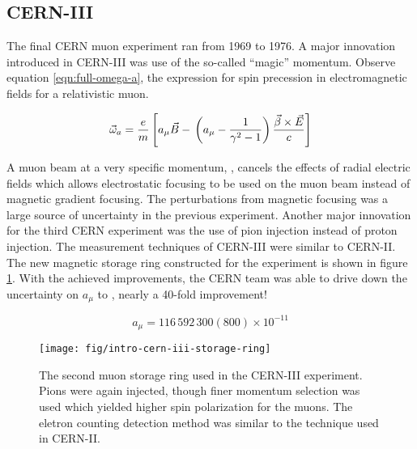 \subsection{CERN-III}
The final CERN muon \gmtwo experiment ran from 1969 to 1976.  A major innovation introduced in CERN-III was use of the so-called ``magic'' momentum. Observe equation \ref{eqn:full-omega-a}, the expression for spin precession in electromagnetic fields for a relativistic muon.

\begin{equation}
\label{eqn:full-omega-a}
\vec{\omega}_a = \frac{e}{m} \left[ a_\mu \vec{B} - \\
\left(a_\mu - \frac{1}{\gamma^2 - 1} \right) \\
\frac{\vec{\beta} \times \vec{E}}{c} \right]
\end{equation}

\noindent A muon beam at a very specific momentum, \pmagic, cancels the effects of radial electric fields which allows electrostatic focusing to be used on the muon beam instead of magnetic gradient focusing.  The perturbations from magnetic focusing was a large source of uncertainty in the previous experiment.  Another major innovation for the third CERN experiment was the use of pion injection instead of proton injection.  The measurement techniques of CERN-III were similar to CERN-II.  The new magnetic storage ring constructed for the experiment is shown in figure \ref{fig:intro-cern-iii-storage-ring}.  With the achieved improvements, the CERN team was able to drive down the uncertainty on $a_\mu$ to  \cite{47y-muon-g-2}, nearly a 40-fold improvement!

\begin{equation}
\label{eqn:cern-iii-results}
a_\mu = 116\,592\,300 (800) \times 10^{-11}
\end{equation}

\begin{figure}
\centering
\texttt{[image: fig/intro-cern-iii-storage-ring]}
\caption{
    The second muon storage ring used in the CERN-III experiment.  Pions were again injected, though finer momentum selection was used which yielded higher spin polarization for the muons.  The eletron counting detection method was similar to the technique used in CERN-II.
    \label{fig:intro-cern-iii-storage-ring}    
}
\end{figure}

